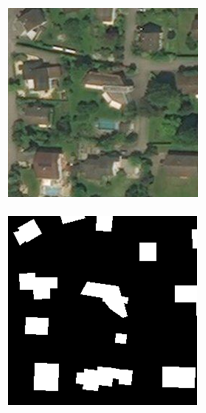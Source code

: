     \begin{figure}[H]
        \centering
        \begin{subfigure}[b]{0.475\textwidth}
            \centering
            \includegraphics[width=\textwidth]{chapters/theoretical_and_experimental_results/images/18_138079_170377.png}
            \caption{}
            \label{fig:results:airtiler_output_orthophoto}
        \end{subfigure}
        \hfill
        \begin{subfigure}[b]{0.475\textwidth}  
            \centering 
            \includegraphics[width=\textwidth]{chapters/theoretical_and_experimental_results/images/18_138079_170377_building.png}

\end{subfigure}
\end{figure}
